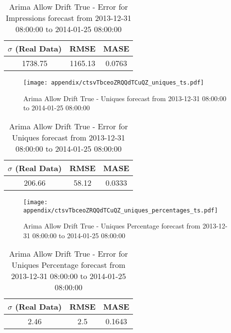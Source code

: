 \begin{table}[H]
\centering
\footnotesize
\begin{tabular}{ccc}
$\sigma$ (Real Data) & RMSE & MASE   \\ \hline
1738.75 & 1165.13 & 0.0763 \\
\end{tabular}

\vspace{0.5cm}

\caption{
Arima Allow Drift True - Error for Impressions forecast from 2013-12-31 08:00:00 to 2014-01-25 08:00:00}
\end{table}

\begin{figure}[H] \begin{center} \leavevmode
\texttt{[image: appendix/ctsvTbceoZRQQdTCuQZ\_uniques\_ts.pdf]} \caption{
Arima Allow Drift True - Uniques forecast from 2013-12-31 08:00:00 to 2014-01-25 08:00:00} \label{fig:appendix/ctsvTbceoZRQQdTCuQZ_uniques_ts.pdf} \end{center}
\end{figure}

\begin{table}[H]
\centering
\footnotesize
\begin{tabular}{ccc}
$\sigma$ (Real Data) & RMSE & MASE   \\ \hline
206.66 & 58.12 & 0.0333 \\
\end{tabular}

\vspace{0.5cm}

\caption{
Arima Allow Drift True - Error for Uniques forecast from 2013-12-31 08:00:00 to 2014-01-25 08:00:00}
\end{table}

\begin{figure}[H] \begin{center} \leavevmode
\texttt{[image: appendix/ctsvTbceoZRQQdTCuQZ\_uniques\_percentages\_ts.pdf]} \caption{
Arima Allow Drift True - Uniques Percentage forecast from 2013-12-31 08:00:00 to 2014-01-25 08:00:00} \label{fig:appendix/ctsvTbceoZRQQdTCuQZ_uniques_percentages_ts.pdf} \end{center}
\end{figure}

\begin{table}[H]
\centering
\footnotesize
\begin{tabular}{ccc}
$\sigma$ (Real Data) & RMSE & MASE   \\ \hline
2.46 & 2.5 & 0.1643 \\
\end{tabular}

\vspace{0.5cm}

\caption{
Arima Allow Drift True - Error for Uniques Percentage forecast from 2013-12-31 08:00:00 to 2014-01-25 08:00:00}
\end{table}

